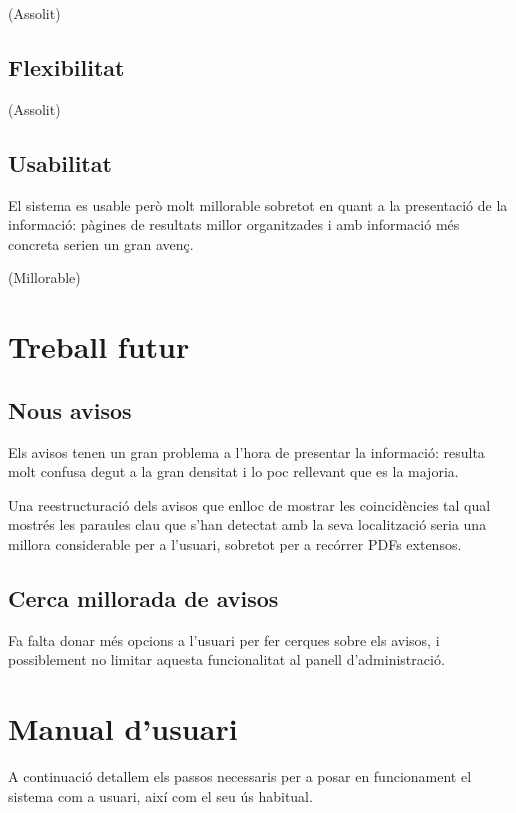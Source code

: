 \documentclass{article}
\begin{document}
(Assolit)

\subsection{Flexibilitat}

(Assolit)

\subsection{Usabilitat}

El sistema es usable però molt millorable sobretot en quant a la presentació de la informació: pàgines de resultats millor organitzades i amb informació més concreta serien un gran avenç.

(Millorable)

\newpage

\section{Treball futur}

\subsection{Nous avisos}

Els avisos tenen un gran problema a l'hora de presentar la informació: resulta molt confusa degut a la gran densitat i lo poc rellevant que es la majoria.

Una reestructuració dels avisos que enlloc de mostrar les coincidències tal qual mostrés les paraules clau que s'han detectat amb la seva localització seria una millora considerable per a l'usuari, sobretot per a recórrer PDFs extensos.

\subsection{Cerca millorada de avisos}

Fa falta donar més opcions a l'usuari per fer cerques sobre els avisos, i possiblement no limitar aquesta funcionalitat al panell d'administració.

\newpage

\section{Manual d'usuari}

A continuació detallem els passos necessaris per a posar en funcionament el sistema com a usuari, així com el seu ús habitual.
\end{document}
